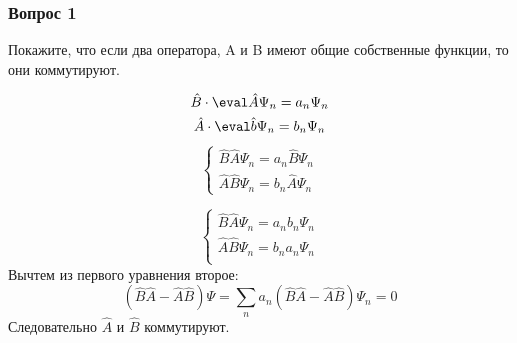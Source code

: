 \subsubsection{Вопрос 1}
Покажите, что если два оператора, A и B имеют общие собственные функции, то
они коммутируют.

\begin{gather*}
	\hat{B}\cdot\eval \hat{A}\Psi_n=a_n\Psi_n \\
	\hat{A}\cdot\eval \hat{b}\Psi_n=b_n\Psi_n
\end{gather*}
\begin{equation*}
\begin{cases}
	\hat{B}\hat{A}\Psi_n=a_n\hat{B}\Psi_n \\
	\hat{A}\hat{B}\Psi_n=b_n\hat{A}\Psi_n
\end{cases}
\end{equation*}

\begin{equation*}
\begin{cases}
	\hat{B}\hat{A}\Psi_n=a_nb_n\Psi_n \\
	\hat{A}\hat{B}\Psi_n=b_na_n\Psi_n \\
\end{cases}
\end{equation*}
Вычтем из первого уравнения второе:
\begin{equation*}
	(\hat{B}\hat{A}-\hat{A}\hat{B})\Psi=\sum\limits_n a_n (\hat{B}\hat{A}-\hat{A}\hat{B})\Psi_n=0
\end{equation*}
Следовательно $\hat{A}$  и $\hat{B}$ коммутируют.